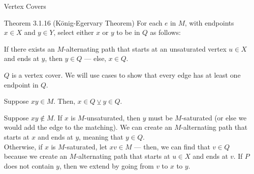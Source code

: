 \documentclass[10pt]{extarticle}
\begin{document}
\begin{problem}{Vertex Covers}
\begin{problem}{Theorem 3.1.16 (König-Egervary Theorem)}
      For each $e$ in $M$, with endpoints $x\in X$ and $y\in Y$, select either $x$ or $y$ to be in $Q$ as follows:
      \begin{description}[font = \normalfont\scshape]
        \item[Rule:] If there exists an $M$-alternating path that starts at an unsaturated vertex $u\in X$ and ends at $y$, then $y\in Q$ --- else, $x\in Q$.
        \item[Claim:] $Q$ is a vertex cover. We will use cases to show that every edge has at least one endpoint in $Q$. 
          \begin{description}[font = \normalfont\scshape]
            \item[Case 1:] Suppose $xy\in M$. Then, $x\in Q\veebar y\in Q$.
            \item[Case 2:] Suppose $xy\notin M$. If $x$ is $M$-unsaturated, then $y$ must be $M$-saturated (or else we would add the edge to the matching). We can create an $M$-alternating path that starts at $x$ and ends at $y$, meaning that $y\in Q$.\\

              Otherwise, if $x$ is $M$-saturated, let $xv\in M$ --- then, we can find that $v\in Q$ because we create an $M$-alternating path that starts at $u\in X$ and ends at $v$. If $P$ does not contain $y$, then we extend by going from $v$ to $x$ to $y$.
          \end{description}
      \end{description}
    \end{problem}
  \end{problem}
\end{document}

